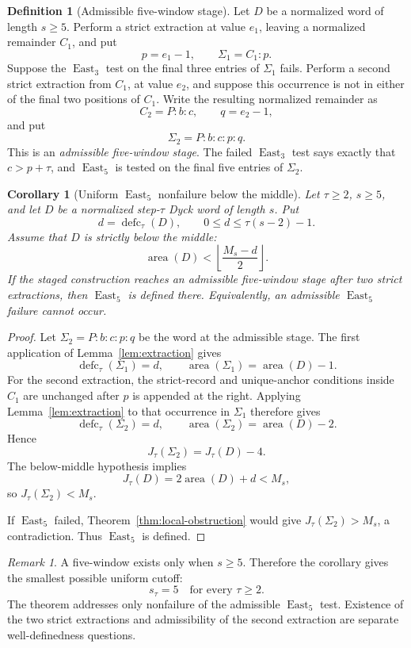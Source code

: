 \documentclass[11pt]{article}
\newtheorem{corollary}[theorem]{Corollary}
\theoremstyle{definition}
\newtheorem{definition}[theorem]{Definition}
\theoremstyle{remark}
\newtheorem{remark}[theorem]{Remark}
\newcommand{\area}{\operatorname{area}}
\newcommand{\defc}{\operatorname{defc}}
\newcommand{\East}{\operatorname{East}}
\begin{document}
\begin{definition}[Admissible five-window stage]
Let \(D\) be a normalized word of length \(s\ge5\).  Perform a strict
extraction at value \(e_1\), leaving a normalized remainder \(C_1\), and
put
\[
  p=e_1-1,
  \qquad
  \Sigma_1=C_1:p.
\]
Suppose the \(\East_3\) test on the final three entries of \(\Sigma_1\)
fails.  Perform a second strict extraction from \(C_1\), at value \(e_2\),
and suppose this occurrence is not in either of the final two positions of
\(C_1\).  Write the resulting normalized remainder as
\[
  C_2=P:b:c,
  \qquad q=e_2-1,
\]
and put
\[
  \Sigma_2=P:b:c:p:q.
\]
This is an \emph{admissible five-window stage}.  The failed \(\East_3\)
test says exactly that \(c>p+\tau\), and \(\East_5\) is tested on the
final five entries of \(\Sigma_2\).
\end{definition}

\begin{corollary}[Uniform \(\East_5\) nonfailure below the middle]
\label{cor:uniform-nonfailure}
Let \(\tau\ge2\), \(s\ge5\), and let \(D\) be a normalized
step-\(\tau\) Dyck word of length \(s\).  Put
\[
  d=\defc_\tau(D),
  \qquad 0\le d\le\tau(s-2)-1.
\]
Assume that \(D\) is strictly below the middle:
\[
  \area(D)<\left\lfloor\frac{M_s-d}{2}\right\rfloor.
\]
If the staged construction reaches an admissible five-window stage after
two strict extractions, then \(\East_5\) is defined there.  Equivalently,
an admissible \(\East_5\) failure cannot occur.
\end{corollary}

\begin{proof}
Let \(\Sigma_2=P:b:c:p:q\) be the word at the admissible stage.  The first
application of Lemma~\ref{lem:extraction} gives
\[
  \defc_\tau(\Sigma_1)=d,
  \qquad
  \area(\Sigma_1)=\area(D)-1.
\]
For the second extraction, the strict-record and unique-anchor conditions
inside \(C_1\) are unchanged after \(p\) is appended at the right.  Applying
Lemma~\ref{lem:extraction} to that occurrence in \(\Sigma_1\) therefore
gives
\[
  \defc_\tau(\Sigma_2)=d,
  \qquad
  \area(\Sigma_2)=\area(D)-2.
\]
Hence
\[
  J_\tau(\Sigma_2)=J_\tau(D)-4.
\]
The below-middle hypothesis implies
\[
  J_\tau(D)=2\area(D)+d<M_s,
\]
so \(J_\tau(\Sigma_2)<M_s\).

If \(\East_5\) failed, Theorem~\ref{thm:local-obstruction} would give
\(J_\tau(\Sigma_2)>M_s\), a contradiction.  Thus \(\East_5\) is
defined.
\end{proof}

\begin{remark}
A five-window exists only when \(s\ge5\).  Therefore the corollary gives
the smallest possible uniform cutoff:
\[
  \boxed{s_\tau=5\quad\text{for every }\tau\ge2.}
\]
The theorem addresses only nonfailure of the admissible \(\East_5\) test.
Existence of the two strict extractions and admissibility of the second
extraction are separate well-definedness questions.
\end{remark}
\end{document}
